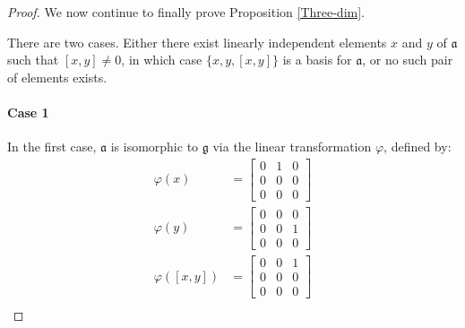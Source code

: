 \documentclass[honours]{UNSWthesis}
\newcommand{\g}{\mathfrak{g}}
\newcommand{\1}{\mathbf{e}_{1}}
\newcommand{\2}{\mathbf{e}_{3}}
\newcommand{\3}{\mathbf{e}_{3}}
\begin{document}
\begin{proof} We now continue to finally prove Proposition \ref{Three-dim}.

There are two cases. Either there exist linearly independent elements $x$ and $y$ of $\mathfrak{a}$ such that $[x,y] \neq 0$, in which case $\{x,y,[x,y]\}$ is a basis for $\mathfrak{a}$, or no such pair of elements exists. 
\paragraph*{Case 1} In the first case, $\mathfrak{a}$ is isomorphic to $\g$ via the linear transformation $\varphi$, defined by:
\begin{align*}
\varphi(x)&=\begin{bmatrix}
0 & 1 & 0 \\
0 & 0 & 0 \\
0 & 0 & 0 
\end{bmatrix}\\
\varphi(y)&=\begin{bmatrix}
0 & 0 & 0 \\
0 & 0 & 1 \\
0 & 0 & 0 
\end{bmatrix}\\
\varphi([x,y])&=\begin{bmatrix}
0 & 0 & 1 \\
0 & 0 & 0 \\
0 & 0 & 0 
\end{bmatrix}\\
\end{align*}



\end{proof}
\end{document}
